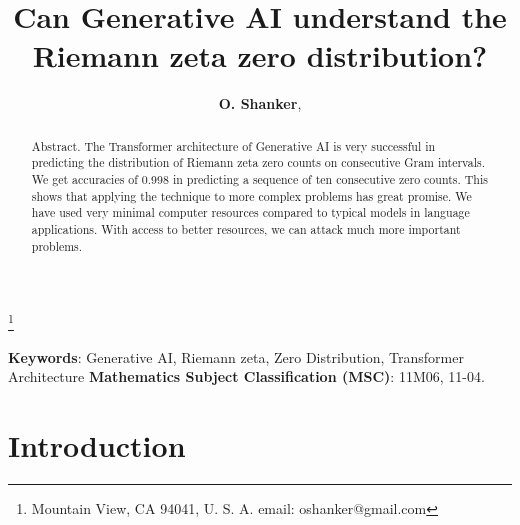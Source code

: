 \documentclass[twoside]{article}
\begin{document}


\newtheorem{theorem}{Theorem}[section]
\newtheorem{lemma}[theorem]{Lemma}

\theoremstyle{definition}
\newtheorem{definition}[theorem]{Definition}
\newtheorem{example}[theorem]{Example}
\newtheorem{xca}[theorem]{Exercise}

\theoremstyle{remark}
\newtheorem{remark}[theorem]{Remark}



\date{}
\lhead[]{}
\rhead[]{}

\title{\bf{Can Generative AI understand the Riemann zeta zero distribution?}}

\maketitle


\author{{\textbf{O. Shanker}},}
\thanks{ Mountain View, CA 94041, U. S. A. email: oshanker@gmail.com}

\thispagestyle{fancy}

\begin{abstract}
Abstract. 
The Transformer architecture of Generative AI is very successful in predicting the distribution of Riemann zeta zero counts on consecutive Gram intervals. We get accuracies of 0.998
in predicting a sequence of ten consecutive zero counts. This shows that applying the technique to more complex problems has great promise. We have used very minimal computer resources compared to typical models in language applications. With access to better resources, we can attack much more important problems.

\end{abstract}
{\textbf {Keywords}:} Generative AI, Riemann zeta, Zero Distribution,  Transformer Architecture 
{\textbf {Mathematics Subject Classification (MSC)}:} 11M06, 11-04.




\section{Introduction}
\end{document}
